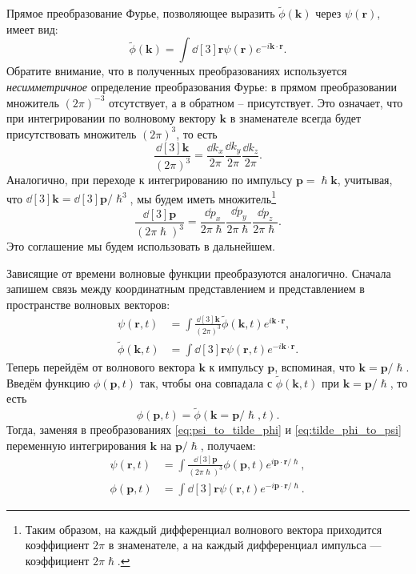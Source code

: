 \documentclass[a4paper, 12pt]{article}
\begin{document}
Прямое преобразование Фурье, позволяющее выразить $\tilde{\phi}(\bm{k})$ через $\psi(\bm{r})$, имеет вид:
\begin{equation}
\tilde{\phi}(\bm{k}) = \int\dd[3]{\bm{r}} \psi(\bm{r}) e^{-i \bm{k} \cdot \bm{r}}.
\label{eq:fourier_forward}
\end{equation}
Обратите внимание, что в полученных преобразованиях используется
\textit{несимметричное} определение преобразования Фурье: в прямом преобразовании
множитель $(2\pi)^{-3}$ отсутствует, а в обратном -- присутствует. Это означает,
что при интегрировании по волновому вектору $\bm{k}$ в знаменателе всегда будет
присутствовать множитель $(2\pi)^3$, то есть
\begin{equation*}
  \frac{\dd[3]{\bm{k}}}{(2\pi)^3} = \frac{\dd k_x}{2\pi} \frac{\dd k_y}{2\pi} \frac{\dd k_z}{2\pi}.
\end{equation*}
Аналогично, при переходе к интегрированию по импульсу $\bm{p} = \hslash \bm{k}$, учитывая,
что $\dd[3]{\bm{k}} = \dd[3]{\bm{p}} / \hslash^3$, мы будем иметь множитель\footnote{Таким образом,
на каждый дифференциал волнового вектора приходится коэффициент $2\pi$ в
знаменателе, а на каждый дифференциал импульса --- коэффициент $2\pi\hslash$.}
\begin{equation*}
  \frac{\dd[3]{\bm{p}}}{(2\pi\hslash)^3} = \frac{\dd p_x}{2\pi\hslash} \frac{\dd p_y}{2\pi\hslash} \frac{\dd p_z}{2\pi\hslash}.
\end{equation*}
Это соглашение мы будем использовать в дальнейшем.

Зависящие от времени волновые функции преобразуются аналогично. Сначала запишем связь между координатным представлением и представлением в пространстве волновых векторов:
\begin{align}
\psi(\bm{r}, t) &= \int \frac{\dd[3]{\bm{k}}}{(2\pi)^3} \tilde{\phi}(\bm{k}, t) e^{i \bm{k} \cdot \bm{r}}, \label{eq:psi_to_tilde_phi} \\
\tilde{\phi}(\bm{k}, t) &= \int \dd[3]{\bm{r}} \psi(\bm{r}, t) e^{-i \bm{k} \cdot \bm{r}}. \label{eq:tilde_phi_to_psi}
\end{align}
Теперь перейдём от волнового вектора $\bm{k}$ к импульсу $\bm{p}$, вспоминая, что $\bm{k} = \bm{p} / \hslash$. Введём функцию $\phi(\bm{p}, t)$ так, чтобы она совпадала с $\tilde{\phi}(\bm{k}, t)$ при $\bm{k} = \bm{p}/\hslash$, то есть
\begin{equation*}
\phi(\bm{p}, t) = \tilde{\phi}(\bm{k}=\bm{p}/\hslash, t).
\end{equation*}
Тогда, заменяя в преобразованиях \eqref{eq:psi_to_tilde_phi} и \eqref{eq:tilde_phi_to_psi} переменную интегрирования $\bm{k}$ на $\bm{p}/\hslash$, получаем:
\begin{align}
\psi(\bm{r}, t) &= \int \frac{\dd[3]{\bm{p}}}{(2\pi\hslash)^3} \phi(\bm{p}, t) e^{i \bm{p} \cdot \bm{r} / \hslash}, \label{eq:psi_to_phi} \\
\phi(\bm{p}, t) &= \int \dd[3]{\bm{r}} \psi(\bm{r}, t) e^{-i \bm{p} \cdot \bm{r} / \hslash}. \label{eq:phi_to_psi}
\end{align}
\end{document}
